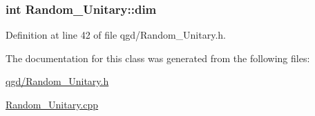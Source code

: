 \subsubsection[{\texorpdfstring{dim}{dim}}]{\setlength{\rightskip}{0pt plus 5cm}int Random\+\_\+\+Unitary\+::dim}\hypertarget{class_random___unitary_a8988de68bf439f8ff5a44d90992ea97e}{}\label{class_random___unitary_a8988de68bf439f8ff5a44d90992ea97e}


Definition at line 42 of file qgd/\+Random\+\_\+\+Unitary.\+h.



The documentation for this class was generated from the following files\+:\begin{DoxyCompactItemize}
\item 
\hyperlink{qgd_2_random___unitary_8h}{qgd/\+Random\+\_\+\+Unitary.\+h}\item 
\hyperlink{_random___unitary_8cpp}{Random\+\_\+\+Unitary.\+cpp}\end{DoxyCompactItemize}
